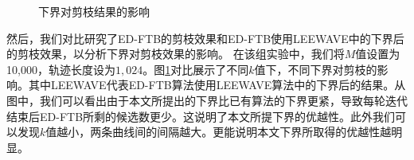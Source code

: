 \begin{figure}
		\centering
	\caption{下界对剪枝结果的影响}
	\label{fig:PruningCmp}
\end{figure}

然后，我们对比研究了ED-FTB的剪枝效果和ED-FTB使用LEEWAVE中的下界后的剪枝效果，以分析下界对剪枝效果的影响。
在该组实验中，我们将$M$值设置为10,000，轨迹长度设为$1,024$。图\ref{fig:PruningCmp}对比展示了不同$k$值下，不同下界对剪枝的影响。其中LEEWAVE代表ED-FTB算法使用LEEWAVE算法中的下界后的结果。从图中，我们可以看出由于本文所提出的下界比已有算法的下界更紧，导致每轮迭代结束后ED-FTB所剩的候选数更少。这说明了本文所提下界的优越性。此外我们可以发现$k$值越小，两条曲线间的间隔越大。更能说明本文下界所取得的优越性越明显。

